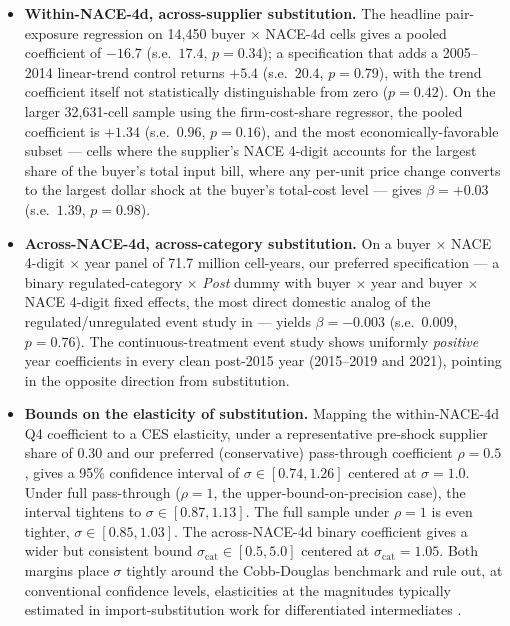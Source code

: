\begin{itemize}
    \item \textbf{Within-NACE-4d, across-supplier substitution.} The headline pair-exposure regression on 14{,}450 buyer $\times$ NACE-4d cells gives a pooled coefficient of $-16.7$ (s.e.\ $17.4$, $p = 0.34$); a specification that adds a 2005--2014 linear-trend control returns $+5.4$ (s.e.\ $20.4$, $p = 0.79$), with the trend coefficient itself not statistically distinguishable from zero ($p = 0.42$). On the larger 32{,}631-cell sample using the firm-cost-share regressor, the pooled coefficient is $+1.34$ (s.e.\ $0.96$, $p = 0.16$), and the most economically-favorable subset --- cells where the supplier's NACE 4-digit accounts for the largest share of the buyer's total input bill, \ie where any per-unit price change converts to the largest dollar shock at the buyer's total-cost level --- gives $\beta = +0.03$ (s.e.\ $1.39$, $p = 0.98$).

    \item \textbf{Across-NACE-4d, across-category substitution.} On a buyer $\times$ NACE 4-digit $\times$ year panel of 71.7 million cell-years, our preferred specification --- a binary regulated-category $\times$ \textit{Post} dummy with buyer $\times$ year and buyer $\times$ NACE 4-digit fixed effects, the most direct domestic analog of the regulated/unregulated event study in \citet{colmeretal2023} --- yields $\beta = -0.003$ (s.e.\ $0.009$, $p = 0.76$). The continuous-treatment event study shows uniformly \emph{positive} year coefficients in every clean post-2015 year (2015--2019 and 2021), pointing in the opposite direction from substitution.

    \item \textbf{Bounds on the elasticity of substitution.} Mapping the within-NACE-4d Q4 coefficient to a CES elasticity, under a representative pre-shock supplier share of $0.30$ and our preferred (conservative) pass-through coefficient $\rho = 0.5$, gives a 95\% confidence interval of $\sigma \in [0.74, 1.26]$ centered at $\sigma = 1.0$. Under full pass-through ($\rho = 1$, the upper-bound-on-precision case), the interval tightens to $\sigma \in [0.87, 1.13]$. The full sample under $\rho = 1$ is even tighter, $\sigma \in [0.85, 1.03]$. The across-NACE-4d binary coefficient gives a wider but consistent bound $\sigma_{\text{cat}} \in [0.5, 5.0]$ centered at $\sigma_{\text{cat}} = 1.05$. Both margins place $\sigma$ tightly around the Cobb-Douglas benchmark and rule out, at conventional confidence levels, elasticities at the magnitudes typically estimated in import-substitution work for differentiated intermediates \citep[e.g.,][]{peter2023}.
\end{itemize}

